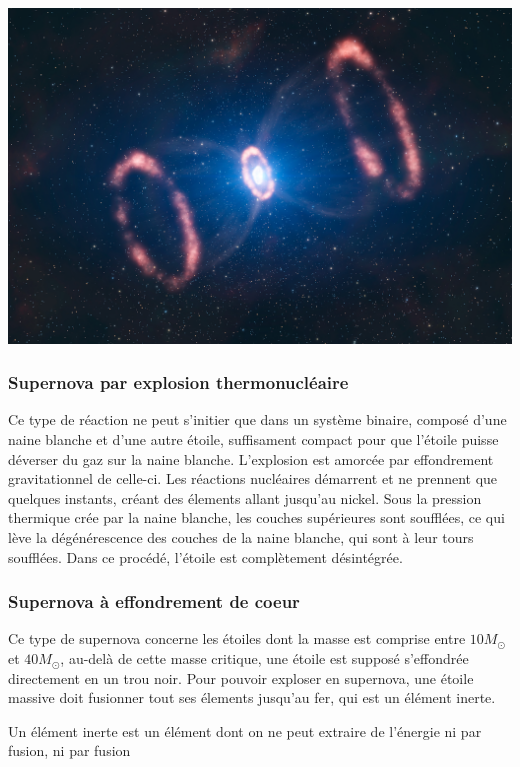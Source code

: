 \documentclass[11pt]{book} %
\begin{document}
\begin{minipage}{0.3\textwidth}
    \includegraphics[width=1\textwidth]{Pictures/SN1987A.jpg}
\end{minipage}

\subsubsection{Supernova par explosion thermonucléaire \cite{supth}\cite{sup1a}}
Ce type de réaction ne peut s'initier que dans un système binaire, composé d'une naine blanche et d'une autre étoile, suffisament compact pour que l'étoile puisse déverser du gaz sur la naine blanche. L'explosion est amorcée par effondrement gravitationnel de celle-ci. Les réactions nucléaires démarrent et ne prennent que quelques instants, créant des élements allant jusqu'au nickel. Sous la pression thermique crée par la naine blanche, les couches supérieures sont soufflées, ce qui lève la dégénérescence des couches de la naine blanche, qui sont à leur tours soufflées. Dans ce procédé, l'étoile est complètement désintégrée.

\subsubsection{Supernova à effondrement de coeur \cite{supec}\cite{sup2}}
Ce type de supernova concerne les étoiles dont la masse est comprise entre \(10M_\odot\) et \(40M_\odot\), au-delà de cette masse critique, une étoile est supposé s'effondrée directement en un trou noir. Pour pouvoir exploser en supernova, une étoile massive doit fusionner tout ses élements jusqu'au fer, qui est un élément inerte.
\begin{remark}
    Un élément inerte est un élément dont on ne peut extraire de l'énergie ni par fusion, ni par fusion 
\end{remark}
\end{document}
